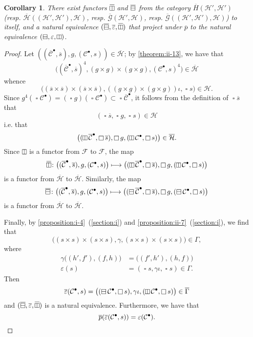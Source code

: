 \documentclass[a4paper,fleqn]{article}
\theoremstyle{plain}
\newtheorem*{corollary*}{Corollary}
\theoremstyle{definition}
\newcommand{\oldpage}[1]{{\marginpar{\footnotesize$\bigg\vert$\,\,\,\,\textit{p.~#1}}}}
\newcommand{\CC}{\mathcal{C}}
\newcommand{\HH}{\mathcal{H}}
\newcommand{\FF}{\mathcal{F}}
\newcommand{\GG}{\mathcal{G}}
\newcommand{\hsqbox}{{\boxminus}}
\newcommand{\vsqbox}{{\rotatebox{90}{$\boxminus$}}}
\DeclareMathOperator{\sq}{\square}
\DeclareMathOperator{\hsq}{\raisebox{-.05em}{$\hsqbox$}}
\DeclareMathOperator{\vsq}{\raisebox{-.1em}{$\vsqbox$}}
\DeclareMathOperator{\ohsq}{\overline{\hsq}}
\DeclareMathOperator{\ovsq}{\overline{\raisebox{-.1em}{$\vsqbox$}}}
\begin{document}
\begin{corollary*}
  There exist functors $\ovsq$ and $\ohsq$ from the category $\overline{H}(\HH',\HH')$ (resp. $\overline{\HH}((\HH',\HH'),\HH)$, resp. $\overline{\GG}(\HH',\HH)$, resp. $\overline{\GG}((\HH',\HH'),\HH)$) to itself, and a natural equivalence $(\ohsq,\overline{\varepsilon},\ovsq)$ that project under $\overline{p}$ to the natural equivalence $(\hsq,\varepsilon,\vsq)$.
\end{corollary*}

\begin{proof}
  Let $((\overline{\CC}^\bullet,\overline{s}),g,(\CC^\bullet,s))\in\overline{\HH}$;
  by \cref{theorem:ii-13}, we have that
  \[
    \big(
      (\overline{\CC}^\bullet,\overline{s})^4,
      (g\times g)\times(g\times g),
      (\CC^\bullet,s)^4
    \big)
    \in\overline{\HH}
  \]
  whence
  \[
    \big(
      (\overline{s}\times\overline{s})\times(\overline{s}\times\overline{s}),
      ((g\times g)\times(g\times g))\iota,
      \sq s
    \big)
    \in\HH.
  \]
  \oldpage{422}
  Since $g^4(\sq\CC^\bullet)=(\sq g)(\sq\CC^\bullet)\subset\sq\overline{\CC}^\bullet$, it follows from the definition of $\sq\overline{s}$ that
  \[
    (\sq\overline{s},\sq g,\sq s)\in\HH
  \]
  i.e. that
  \[
    \big(
      (\vsq\overline{\CC}^\bullet,\sq\overline{s}),
      \sq g,
      (\vsq\CC^\bullet,\sq s)
    \big)
    \in\overline{\HH}.
  \]
  Since $\vsq$ is a functor from $\FF$ to $\FF$, the map
  \[
    \ovsq\colon
    \big(
      (\overline{\CC}^\bullet,\overline{s}),
      g,
      (\CC^\bullet,s)
    \big)
    \longmapsto
    \big(
      (\vsq\overline{\CC}^\bullet,\sq\overline{s}),
      \sq g,
      (\vsq\CC^\bullet,\sq s)
    \big)
  \]
  is a functor from $\overline{\HH}$ to $\overline{\HH}$.
  Similarly, the map
  \[
    \ohsq\colon
    \big(
      (\overline{\CC}^\bullet,\overline{s}),
      g,
      (\CC^\bullet,s)
    \big)
    \longmapsto
    \big(
      (\hsq\overline{\CC}^\bullet,\sq\overline{s}),
      \sq g,
      (\hsq\CC^\bullet,\sq s)
    \big)
  \]
  is a functor from $\overline{\HH}$ to $\overline{\HH}$.

  Finally, by \cref{proposition:i-4}~(\cref{section:i}) and \cref{proposition:ii-7}~(\cref{section:i}), we find that
  \[
    \big(
      (s\times s)\times(s\times s),
      \gamma,
      (s\times s)\times(s\times s)
    \big)
    \in\Gamma,
  \]
  where
  \[
    \begin{aligned}
      \gamma\big((h',f'),(f,h)\big)
      &= \big((f',h'),(h,f)\big)
    \\\varepsilon(s)
      &= (\sq s,\gamma\iota,\sq s)
      \in\Gamma.
    \end{aligned}
  \]
  Then
  \[
    \overline{\varepsilon}(\CC^\bullet,s)
    = \big(
      (\hsq\CC^\bullet,\sq s),
      \gamma\iota,
      (\vsq\CC^\bullet,\sq s)
    \big)
    \in\overline{\Gamma}
  \]
  and $(\ohsq,\overline{\varepsilon},\ovsq)$ is a natural equivalence.
  Furthermore, we have that
  \[
    \overline{p}(\overline{\varepsilon}(\CC^\bullet,s))
    = \varepsilon(\CC^\bullet).
    \qedhere
  \]
\end{proof}
\end{document}
